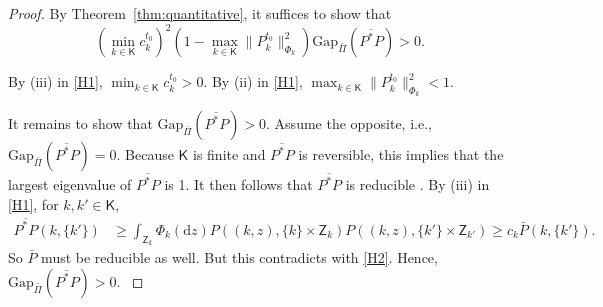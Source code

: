 \documentclass[12pt]{article}
\newcommand{\df}{\mathrm{d}}
\newcommand{\Z}{\mathsf{Z}}
\begin{document}
\begin{proof}
	By Theorem~\ref{thm:quantitative}, it suffices to show that 
	\[
	\left( \min_{k \in \mathsf{K}} c_k^{t_0} \right)^2 \left( 1 - \max_{k \in \mathsf{K}} \|P_k^{t_0} \|_{\Phi_k}^2 \right) \mbox{Gap}_{\bar{\Pi}}(\overline{P^*P}) > 0.
	\]
	
	By (iii) in \ref{H1}, $\min_{k \in \mathsf{K}} c_k^{t_0} > 0$.
	By (ii) in \ref{H1}, $\max_{k \in \mathsf{K}} \|P_k^{t_0} \|_{\Phi_k}^2 < 1$.
	
	{
	It remains to show that $\mbox{Gap}_{\bar{\Pi}}(\overline{P^*P}) > 0$.
	Assume the opposite, i.e., $\mbox{Gap}_{\bar{\Pi}}(\overline{P^*P}) = 0$.
	Because $\mathsf{K}$ is finite and $\overline{P^*P}$ is reversible, this implies that the largest eigenvalue of $\overline{P^*P}$ is 1.
	It then follows that $\overline{P^*P}$ is reducible \citep[][Theorem 3.11]{hairer2006ergodic}.
	By (iii) in \ref{H1}, for $k, k' \in \mathsf{K}$,
	\[
	\begin{aligned}
		\overline{P^*P}(k, \{k'\}) &\geq \int_{\Z_k} \Phi_k(\df z) P((k,z), \{k\} \times \Z_k ) P((k,z), \{k'\} \times \Z_{k'}) \geq c_k \bar{P}(k,\{k'\}).
	\end{aligned}
	\]
	So $\bar{P}$ must be reducible as well.
	But this contradicts with \ref{H2}.
	Hence, $\mbox{Gap}_{\bar{\Pi}}(\overline{P^*P}) > 0$.
	}
	

\end{proof}
\end{document}
